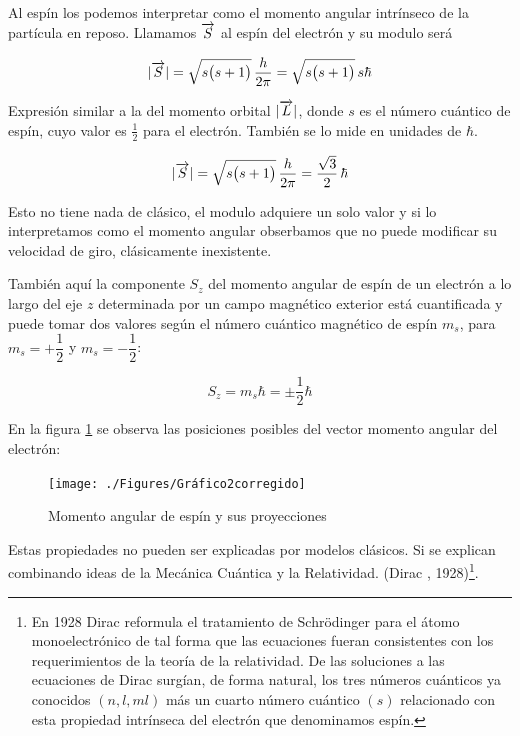 Al espín los podemos interpretar como el momento angular intrínseco de la partícula en reposo. Llamamos $\overrightarrow{S}$ al espín del electrón y su modulo será

\begin{equation}
 |\overrightarrow{S}| = \sqrt{s \big(s+1\big) } \, \frac{h}{2 \pi } = \sqrt{s \big(s+1\big) } \,s\hbar 
\end{equation}

Expresión similar a la del momento orbital $|\overrightarrow{L}|$, donde $s$ es el número cuántico de espín, cuyo valor es $\frac{1}{2}$ para el electrón. También se lo mide en unidades de $\hbar$.
 
\begin{equation}
 |\overrightarrow{S}| = \sqrt{s \big(s+1\big) } \, \frac{h}{2 \pi } = \frac{\sqrt{3}}{2}\, \hbar
\end{equation}

Esto no tiene nada de clásico, el modulo adquiere un solo valor y si lo interpretamos como el momento angular obserbamos que no puede modificar su velocidad de giro, clásicamente inexistente.

También aquí la componente $S_{z}$ del momento angular de espín de un electrón a lo largo del eje $z$ determinada por un campo magnético exterior está cuantificada y puede tomar dos valores según el número cuántico magnético de espín $m_{s}$, para $m_{s}=+\dfrac{1}{2}$ y $m_{s}=-\dfrac{1}{2}$:

\begin{equation}
 S_{z} = m_{s} \hbar = \pm \frac{1}{2} \hbar
\end{equation}

En la figura \ref{fig:Gráfico2corregido} se observa las posiciones posibles del vector momento angular del electrón:

\begin{figure}[H]
    \centering
    \texttt{[image: ./Figures/Gráfico2corregido]}
	\caption{Momento angular de espín y sus proyecciones}
	\label{fig:Gráfico2corregido}
\end{figure}

Estas propiedades no pueden ser explicadas por modelos clásicos. Si se explican combinando ideas de la Mecánica Cuántica y la Relatividad. (Dirac , 1928)\footnote{En 1928 Dirac reformula el tratamiento de Schrödinger para el átomo monoelectrónico de tal forma que las ecuaciones fueran consistentes con los requerimientos de la teoría de la relatividad. De las soluciones a las ecuaciones de Dirac surgían, de forma natural, los tres números cuánticos ya conocidos $(n, l, ml)$ más un cuarto número cuántico $(s)$ relacionado con esta propiedad intrínseca del electrón que denominamos espín.}.











